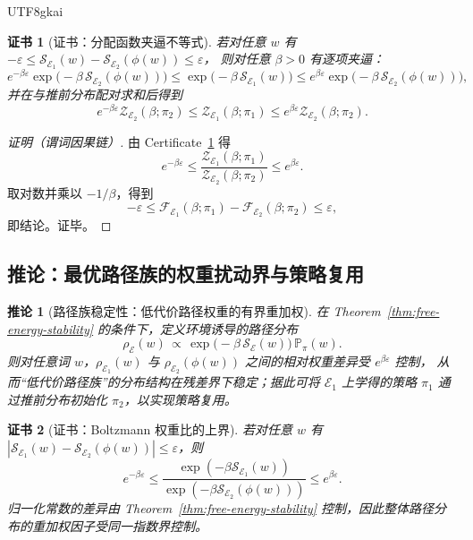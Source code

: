 \documentclass[12pt]{article}
\newtheorem{corollary}{推论}[section]
\newtheorem{certificate}{证书}[section]
\begin{document}
\begin{CJK*}{UTF8}{gkai}
\begin{certificate}[证书：分配函数夹逼不等式]
\label{cert:partition-sandwich}
若对任意 $w$ 有 $-\varepsilon\le \mathcal{S}_{\mathcal{E}_1}(w)-\mathcal{S}_{\mathcal{E}_2}(\phi(w))\le \varepsilon$，
则对任意 $\beta>0$ 有逐项夹逼：
\[
e^{-\beta\varepsilon}\exp\!\bigl(-\beta\,\mathcal{S}_{\mathcal{E}_2}(\phi(w))\bigr)
\le
\exp\!\bigl(-\beta\,\mathcal{S}_{\mathcal{E}_1}(w)\bigr)
\le
e^{\beta\varepsilon}\exp\!\bigl(-\beta\,\mathcal{S}_{\mathcal{E}_2}(\phi(w))\bigr),
\]
并在与推前分布配对求和后得到
\[
e^{-\beta\varepsilon}\mathcal{Z}_{\mathcal{E}_2}(\beta;\pi_2)
\le
\mathcal{Z}_{\mathcal{E}_1}(\beta;\pi_1)
\le
e^{\beta\varepsilon}\mathcal{Z}_{\mathcal{E}_2}(\beta;\pi_2).
\]
\end{certificate}

\begin{proof}[证明（谓词因果链）]
由 Certificate~\ref{cert:partition-sandwich} 得
\[
e^{-\beta\varepsilon}\le \frac{\mathcal{Z}_{\mathcal{E}_1}(\beta;\pi_1)}{\mathcal{Z}_{\mathcal{E}_2}(\beta;\pi_2)}\le
  e^{\beta\varepsilon}.
\]
取对数并乘以 $-1/\beta$，得到
\[
-\varepsilon\le \mathcal{F}_{\mathcal{E}_1}(\beta;\pi_1)-\mathcal{F}_{\mathcal{E}_2}(\beta;\pi_2)\le \varepsilon,
\]
即结论。证毕。
\end{proof}

\subsection{推论：最优路径族的权重扰动界与策略复用}

\begin{corollary}[路径族稳定性：低代价路径权重的有界重加权]
\label{cor:path-family-stability}
在 Theorem~\ref{thm:free-energy-stability} 的条件下，定义环境诱导的路径分布
\[
\rho_{\mathcal{E}}(w)
\,\propto\,
\exp\!\bigl(-\beta\,\mathcal{S}_{\mathcal{E}}(w)\bigr)\,\mathbb{P}_{\pi}(w).
\]
则对任意词 $w$，$\rho_{\mathcal{E}_1}(w)$ 与 $\rho_{\mathcal{E}_2}(\phi(w))$ 之间的相对权重差异受 $e^{\beta\varepsilon}$ 控制，
从而“低代价路径族”的分布结构在残差界下稳定；据此可将 $\mathcal{E}_1$ 上学得的策略 $\pi_1$ 通过推前分布初始化 $\pi_2$，以实现策略复用。
\end{corollary}

\begin{certificate}[证书：Boltzmann 权重比的上界]
\label{cert:boltzmann-ratio}
若对任意 $w$ 有 $|\mathcal{S}_{\mathcal{E}_1}(w)-\mathcal{S}_{\mathcal{E}_2}(\phi(w))|\le \varepsilon$，则
\[
e^{-\beta\varepsilon}
\le
\frac{\exp(-\beta\mathcal{S}_{\mathcal{E}_1}(w))}{\exp(-\beta\mathcal{S}_{\mathcal{E}_2}(\phi(w)))}
\le
e^{\beta\varepsilon}.
\]
归一化常数的差异由 Theorem~\ref{thm:free-energy-stability} 控制，因此整体路径分布的重加权因子受同一指数界控制。
\end{certificate}


\end{CJK*}
\end{document}
